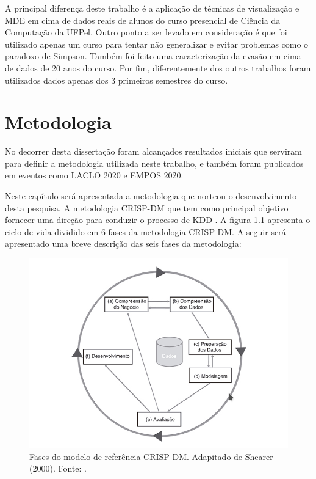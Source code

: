 \documentclass[diss,capa]{texufpel}
\begin{document}
A principal diferença deste trabalho é a aplicação de técnicas de visualização e MDE em cima de dados reais de alunos do curso presencial de Ciência da Computação da UFPel.
Outro ponto a ser levado em consideração é que foi utilizado apenas um curso para tentar não generalizar e evitar problemas como o paradoxo de Simpson.
Também foi feito uma caracterização da evasão em cima de dados de 20 anos do curso.
Por fim, diferentemente dos outros trabalhos foram utilizados dados apenas dos 3 primeiros semestres do curso.

\chapter{Metodologia}
\label{cap:metodologia}

No decorrer desta dissertação foram alcançados resultados iniciais que serviram para definir a metodologia utilizada neste trabalho, e também foram publicados em eventos como LACLO 2020 e EMPOS 2020.

Neste capítulo será apresentada a metodologia que norteou o desenvolvimento desta pesquisa.
A metodologia CRISP-DM que tem como principal objetivo fornecer uma direção para conduzir o processo de KDD \cite{goldschmidt2015data}.
A figura \ref{fig:fases-metodologia-crips-dm} apresenta o ciclo de vida dividido em 6 fases da metodologia CRISP-DM.
A seguir será apresentado uma breve descrição das seis fases da metodologia:

\begin{figure}[htbp]
\centering \includegraphics[scale=.7]{imagens/fase-metodologia-crisp-dm.png}
\caption{Fases do modelo de referência CRISP-DM. Adapitado de Shearer (2000). Fonte: \cite{goldschmidt2015data}.}
\label{fig:fases-metodologia-crips-dm}
\end{figure}
\end{document}
